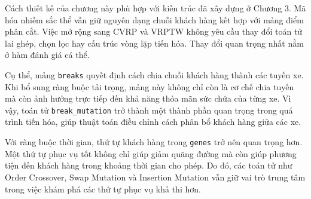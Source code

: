 \documentclass[12pt,a4paper]{article}
\numberwithin{figure}{subsection}
\numberwithin{table}{subsection}
\begin{document}
Cách thiết kế của chương này phù hợp với kiến trúc đã xây dựng ở Chương 3. Mã hóa nhiễm sắc thể vẫn giữ nguyên dạng chuỗi khách hàng kết hợp với mảng điểm phân cắt. Việc mở rộng sang CVRP và VRPTW không yêu cầu thay đổi toán tử lai ghép, chọn lọc hay cấu trúc vòng lặp tiến hóa. Thay đổi quan trọng nhất nằm ở hàm đánh giá cá thể.

Cụ thể, mảng \texttt{breaks} quyết định cách chia chuỗi khách hàng thành các tuyến xe. Khi bổ sung ràng buộc tải trọng, mảng này không chỉ còn là cơ chế chia tuyến mà còn ảnh hưởng trực tiếp đến khả năng thỏa mãn sức chứa của từng xe. Vì vậy, toán tử \texttt{break\_mutation} trở thành một thành phần quan trọng trong quá trình tiến hóa, giúp thuật toán điều chỉnh cách phân bổ khách hàng giữa các xe.

Với ràng buộc thời gian, thứ tự khách hàng trong \texttt{genes} trở nên quan trọng hơn. Một thứ tự phục vụ tốt không chỉ giúp giảm quãng đường mà còn giúp phương tiện đến khách hàng trong khoảng thời gian cho phép. Do đó, các toán tử như Order Crossover, Swap Mutation và Insertion Mutation vẫn giữ vai trò trung tâm trong việc khám phá các thứ tự phục vụ khả thi hơn.
\end{document}
